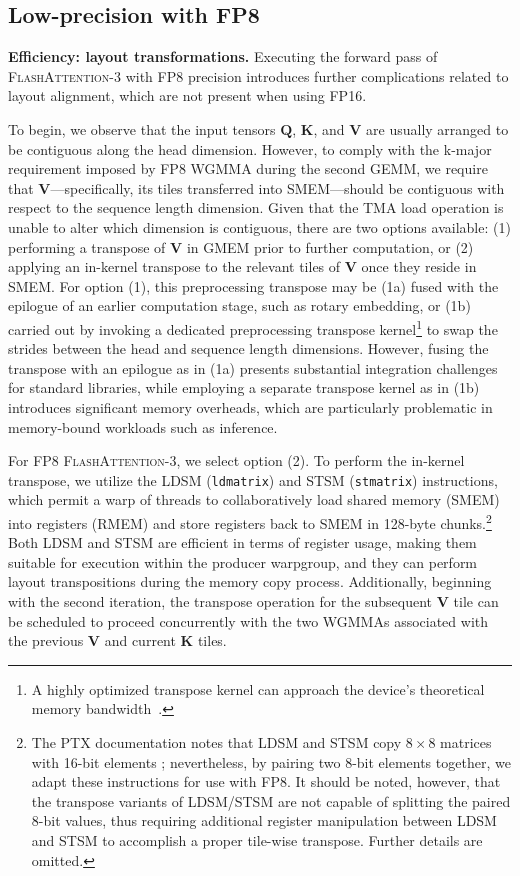 \subsection{Low-precision with FP8}
\label{sec:algofp8}

\textbf{Efficiency: layout transformations.} Executing the forward pass of \textsc{FlashAttention-3} with FP8 precision introduces further complications related to layout alignment, which are not present when using FP16.

To begin, we observe that the input tensors $\mathbf{Q}$, $\mathbf{K}$, and $\mathbf{V}$ are usually arranged to be contiguous along the head dimension. However, to comply with the k-major requirement imposed by FP8 WGMMA during the second GEMM, we require that $\mathbf{V}$—specifically, its tiles transferred into SMEM—should be contiguous with respect to the sequence length dimension. Given that the TMA load operation is unable to alter which dimension is contiguous, there are two options available: (1) performing a transpose of $\mathbf{V}$ in GMEM prior to further computation, or (2) applying an in-kernel transpose to the relevant tiles of $\mathbf{V}$ once they reside in SMEM. For option (1), this preprocessing transpose may be (1a) fused with the epilogue of an earlier computation stage, such as rotary embedding, or (1b) carried out by invoking a dedicated preprocessing transpose kernel\footnote{A highly optimized transpose kernel can approach the device’s theoretical memory bandwidth~\citep{colfax_cutlass_transpose_2024}.} to swap the strides between the head and sequence length dimensions. However, fusing the transpose with an epilogue as in (1a) presents substantial integration challenges for standard libraries, while employing a separate transpose kernel as in (1b) introduces significant memory overheads, which are particularly problematic in memory-bound workloads such as inference.

For FP8 \textsc{FlashAttention-3}, we select option (2). To perform the in-kernel transpose, we utilize the LDSM (\verb|ldmatrix|) and STSM (\verb|stmatrix|) instructions, which permit a warp of threads to collaboratively load shared memory (SMEM) into registers (RMEM) and store registers back to SMEM in 128-byte chunks.\footnote{The PTX documentation notes that LDSM and STSM copy $8 \times 8$ matrices with 16-bit elements \cite[\S 9.7.13.4.15-16]{ptx}; nevertheless, by pairing two 8-bit elements together, we adapt these instructions for use with FP8. It should be noted, however, that the transpose variants of LDSM/STSM are not capable of splitting the paired 8-bit values, thus requiring additional register manipulation between LDSM and STSM to accomplish a proper tile-wise transpose. Further details are omitted.} Both LDSM and STSM are efficient in terms of register usage, making them suitable for execution within the producer warpgroup, and they can perform layout transpositions during the memory copy process. Additionally, beginning with the second iteration, the transpose operation for the subsequent $\mathbf{V}$ tile can be scheduled to proceed concurrently with the two WGMMAs associated with the previous $\mathbf{V}$ and current $\mathbf{K}$ tiles.

